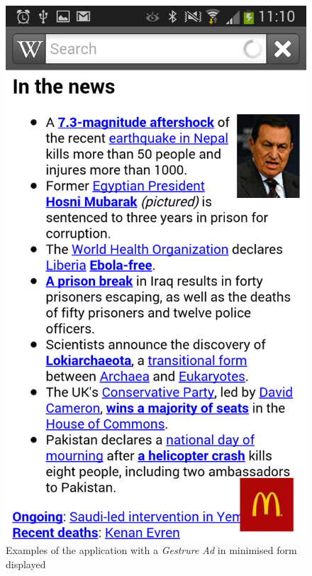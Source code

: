 \begin{figure}
\begin{center}
\includegraphics[scale=0.25]{Images/gesturead_small2.png}
\caption{Examples of the application with a \textit{Gestrure Ad} in minimised form displayed}
\label{fig:ads2}
\end{center}
\end{figure}

